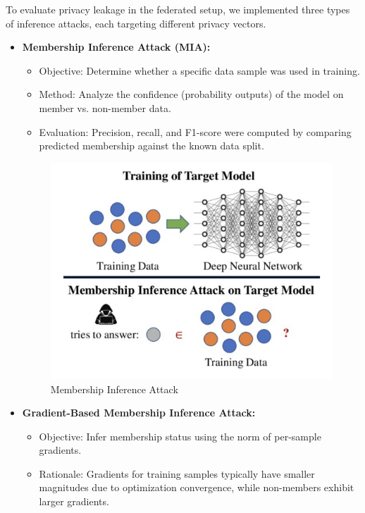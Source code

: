 \documentclass[conference]{IEEEtran}
\begin{document}
\begin{enumerate}
    \newline To evaluate privacy leakage in the federated setup, we implemented three types of inference attacks, each targeting different privacy vectors.
    \begin{itemize}
        \item \textbf{Membership Inference Attack (MIA):}
        \begin{itemize}
            \item Objective: Determine whether a specific data sample was used in training.
            \item Method: Analyze the confidence (probability outputs) of the model on member vs. non-member data.
            \item Evaluation: Precision, recall, and F1-score were computed by comparing predicted membership against the known data split.
        \end{itemize}
        \begin{figure}[H]
        \centering
        \includegraphics[width=\linewidth]{Membership_Inference_Attack.png}
        \caption{Membership Inference Attack \cite{shi2020overtheair63}}
    \end{figure}
        \item \textbf{Gradient-Based Membership Inference Attack:}
        \begin{itemize}
            \item Objective: Infer membership status using the norm of per-sample gradients.
            \item Rationale: Gradients for training samples typically have smaller magnitudes due to optimization convergence, while non-members exhibit larger gradients.

\end{itemize}
\end{itemize}
\end{enumerate}
\end{document}
